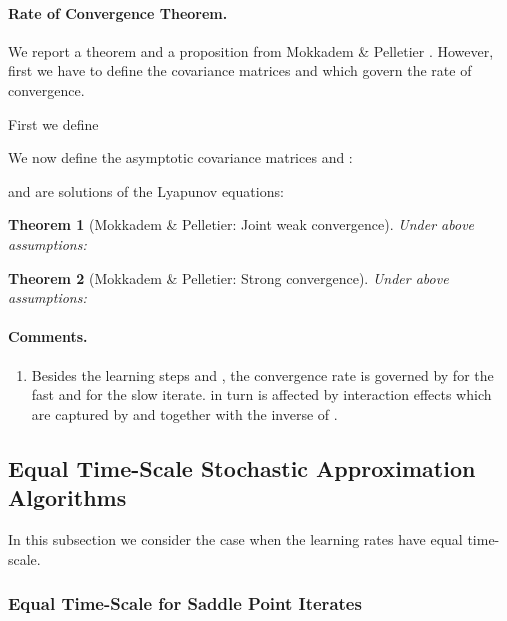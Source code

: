 \documentclass{article}
\newtheorem{theorem}{Theorem}
\begin{document}
\paragraph{Rate of Convergence Theorem.}

We report a theorem and a proposition from
Mokkadem \& Pelletier \cite{Mokkadem:06}.
However, first we have to define the covariance matrices
 and  which govern the rate of convergence.

First we define

We now define the asymptotic covariance matrices  and
:


 and  are solutions of the Lyapunov
equations:



\begin{theorem}[Mokkadem \& Pelletier: Joint weak convergence]
\label{th:Mokkadem}
Under above assumptions:

\end{theorem}


\begin{theorem}[Mokkadem \& Pelletier: Strong convergence]
\label{th:Mokkadem1}
Under above assumptions:

\end{theorem}

\paragraph{Comments.}
\begin{enumerate}[label=\textbf{(C\arabic*)}]
\item
Besides the learning steps  and ,
the convergence rate is governed by
 for the fast and 
for the slow iterate.
 in turn is affected by interaction effects which are
captured by  and  together with the inverse of
.

\end{enumerate}

\subsection{Equal Time-Scale Stochastic Approximation Algorithms}
\label{sec:equalTime}


In this subsection we consider the case when the learning rates have
equal time-scale.


\subsubsection{Equal Time-Scale for Saddle Point Iterates}
\end{document}
